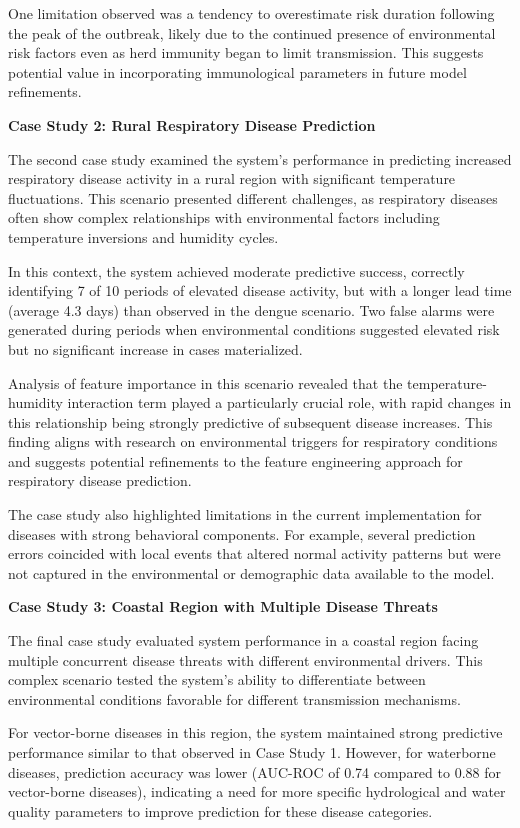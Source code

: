 \documentclass[12pt,a4paper]{report}
\begin{document}
One limitation observed was a tendency to overestimate risk duration following the peak of the outbreak, likely due to the continued presence of environmental risk factors even as herd immunity began to limit transmission. This suggests potential value in incorporating immunological parameters in future model refinements.

\textbf{Case Study 2: Rural Respiratory Disease Prediction}

The second case study examined the system's performance in predicting increased respiratory disease activity in a rural region with significant temperature fluctuations. This scenario presented different challenges, as respiratory diseases often show complex relationships with environmental factors including temperature inversions and humidity cycles.

In this context, the system achieved moderate predictive success, correctly identifying 7 of 10 periods of elevated disease activity, but with a longer lead time (average 4.3 days) than observed in the dengue scenario. Two false alarms were generated during periods when environmental conditions suggested elevated risk but no significant increase in cases materialized.

Analysis of feature importance in this scenario revealed that the temperature-humidity interaction term played a particularly crucial role, with rapid changes in this relationship being strongly predictive of subsequent disease increases. This finding aligns with research on environmental triggers for respiratory conditions and suggests potential refinements to the feature engineering approach for respiratory disease prediction.

The case study also highlighted limitations in the current implementation for diseases with strong behavioral components. For example, several prediction errors coincided with local events that altered normal activity patterns but were not captured in the environmental or demographic data available to the model.

\textbf{Case Study 3: Coastal Region with Multiple Disease Threats}

The final case study evaluated system performance in a coastal region facing multiple concurrent disease threats with different environmental drivers. This complex scenario tested the system's ability to differentiate between environmental conditions favorable for different transmission mechanisms.

For vector-borne diseases in this region, the system maintained strong predictive performance similar to that observed in Case Study 1. However, for waterborne diseases, prediction accuracy was lower (AUC-ROC of 0.74 compared to 0.88 for vector-borne diseases), indicating a need for more specific hydrological and water quality parameters to improve prediction for these disease categories.
\end{document}
